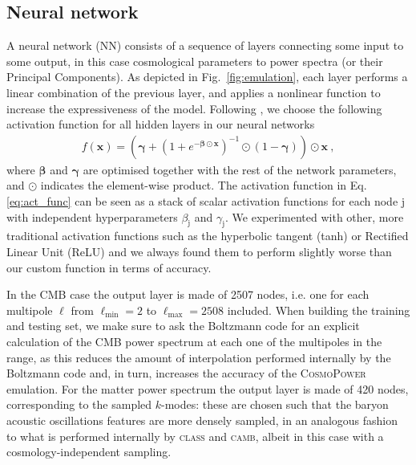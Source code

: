\documentclass[fleqn,usenatbib]{mnras}
\begin{document}
\subsection{Neural network}
\label{app:nn}
A neural network (NN) consists of a sequence of layers connecting some input to some output, in this case cosmological parameters to power spectra (or their Principal Components). As depicted in Fig.~\ref{fig:emulation}, each layer performs a linear combination of the previous layer, and applies a nonlinear function to increase the expressiveness of the model. Following \citet{Alsing20}, we choose the following activation function for all hidden layers in our neural networks
\begin{align}\label{eq:act_func}
    f(\boldsymbol{x}) = \left ( \boldsymbol{\gamma} + \left ( 1 + e^{-\boldsymbol{\beta}\odot\boldsymbol{x}} \right ) ^{-1} \odot (1-\boldsymbol{\gamma}) \right ) \odot \boldsymbol{x} \ ,
\end{align}
where $\boldsymbol{\beta}$ and $\boldsymbol{\gamma}$ are optimised together with the rest of the network parameters, and $\odot$ indicates the element-wise product. The activation function in Eq. \ref{eq:act_func} can be seen as a stack of scalar activation functions for each node $\mathrm{j}$ with independent hyperparameters $\beta_{\mathrm{j}}$ and $\gamma_{\mathrm{j}}$. We experimented with other, more traditional activation functions such as the hyperbolic tangent (tanh) or Rectified Linear Unit (ReLU) \citep{Agarap18} and we always found them to perform slightly worse than our custom function in terms of accuracy. 

In the CMB case the output layer is made of 2507 nodes, i.e. one for each multipole $\ell$ from $\ell_{\mathrm{min}}=2$ to $\ell_{\mathrm{max}}=2508$ included. When building the training and testing set, we make sure to ask the Boltzmann code for an explicit calculation of the CMB power spectrum at each one of the multipoles in the range, as this reduces the amount of interpolation performed internally by the Boltzmann code and, in turn, increases the accuracy of the \textsc{CosmoPower} emulation. For the matter power spectrum the output layer is made of 420 nodes, corresponding to the sampled $k$-modes: these are chosen such that the baryon acoustic oscillations features are more densely sampled, in an analogous fashion to what is performed internally by \textsc{class} and \textsc{camb}, albeit in this case with a cosmology-independent sampling.
\end{document}
